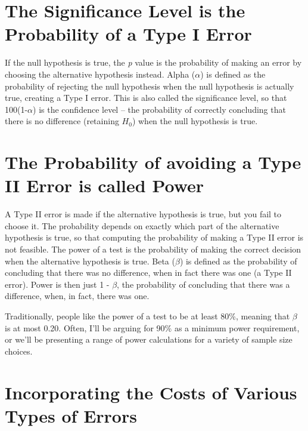 \documentclass[
]{book}
\begin{document}
\hypertarget{the-significance-level-is-the-probability-of-a-type-i-error}{%
\section{The Significance Level is the Probability of a Type I Error}\label{the-significance-level-is-the-probability-of-a-type-i-error}}

If the null hypothesis is true, the \emph{p} value is the probability of making an error by choosing the alternative hypothesis instead. Alpha (\(\alpha\)) is defined as the probability of rejecting the null hypothesis when the null hypothesis is actually true, creating a Type I error. This is also called the significance level, so that 100(1-\(\alpha\)) is the confidence level -- the probability of correctly concluding that there is no difference (retaining \(H_0\)) when the null hypothesis is true.

\hypertarget{the-probability-of-avoiding-a-type-ii-error-is-called-power}{%
\section{The Probability of avoiding a Type II Error is called Power}\label{the-probability-of-avoiding-a-type-ii-error-is-called-power}}

A Type II error is made if the alternative hypothesis is true, but you fail to choose it. The probability depends on exactly which part of the alternative hypothesis is true, so that computing the probability of making a Type II error is not feasible. The power of a test is the probability of making the correct decision when the alternative hypothesis is true. Beta (\(\beta\)) is defined as the probability of concluding that there was no difference, when in fact there was one (a Type II error). Power is then just 1 - \(\beta\), the probability of concluding that there was a difference, when, in fact, there was one.

Traditionally, people like the power of a test to be at least 80\%, meaning that \(\beta\) is at most 0.20. Often, I'll be arguing for 90\% as a minimum power requirement, or we'll be presenting a range of power calculations for a variety of sample size choices.

\hypertarget{incorporating-the-costs-of-various-types-of-errors}{%
\section{Incorporating the Costs of Various Types of Errors}\label{incorporating-the-costs-of-various-types-of-errors}}
\end{document}
